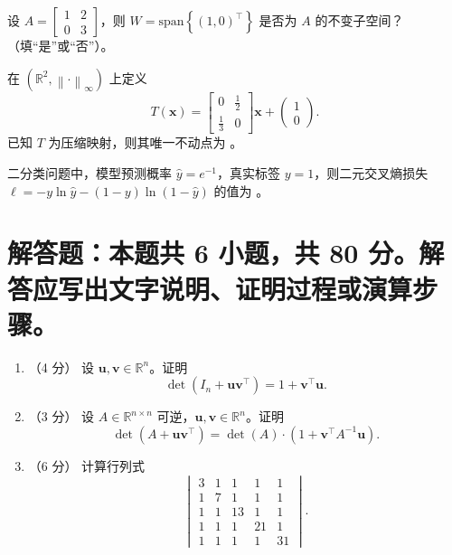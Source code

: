 \documentclass[11pt,a4paper]{exam-zh}
\newcommand{\bvec}[1]{\boldsymbol{#1}}
\newcommand{\Span}{\mathrm{span}}
\newcommand{\R}{\mathbb{R}}
\begin{document}
\begin{question}
  设 $A = \begin{bmatrix} 1 & 2 \\ 0 & 3 \end{bmatrix}$，则 $W = \Span\left\{\left(1, 0\right)^\top\right\}$ 是否为 $A$ 的不变子空间？\fillin （填“是”或“否”）。
\end{question}

\begin{question}
  在 $\left(\R^2,\left\|\cdot\right\|_\infty\right)$ 上定义
  \[
  T\left(\bvec{x}\right)=
  \begin{bmatrix}0&\frac12\\[1mm]\frac13&0\end{bmatrix}\bvec{x}
  +\begin{pmatrix}1\\0\end{pmatrix}.
  \]
  已知 $T$ 为压缩映射，则其唯一不动点为 \fillin 。
\end{question}

\begin{question}
  二分类问题中，模型预测概率 $\hat{y} = e^{-1}$，真实标签 $y = 1$，则二元交叉熵损失 $\ell = -y\ln\hat{y} - (1-y)\ln(1-\hat{y})$ 的值为 \fillin 。
\end{question}


\section{解答题：本题共 6 小题，共 80 分。解答应写出文字说明、证明过程或演算步骤。}

\begin{problem}[points = 13]

\begin{enumerate}
    \item （4 分） 设 $\bvec{u}, \bvec{v} \in \R^n$。证明
    $$\det\!\left(I_n + \bvec{u}\bvec{v}^\top\right) = 1 + \bvec{v}^\top\bvec{u}.$$

    \item （3 分） 设 $A \in \R^{n \times n}$ 可逆，$\bvec{u}, \bvec{v} \in \R^n$。证明
    $$\det\!\left(A + \bvec{u}\bvec{v}^\top\right) = \det(A) \cdot \left(1 + \bvec{v}^\top A^{-1}\bvec{u}\right).$$

    \item （6 分） 计算行列式 $$\begin{vmatrix}
    3   & 1 & 1  & 1  & 1 \\
    1   & 7 & 1  & 1  & 1 \\
    1   & 1 & 13 & 1  & 1 \\
    1   & 1 & 1  & 21 & 1 \\
    1   & 1 & 1  & 1  & 31
    \end{vmatrix}.$$
\end{enumerate}
\end{problem}
\end{document}

